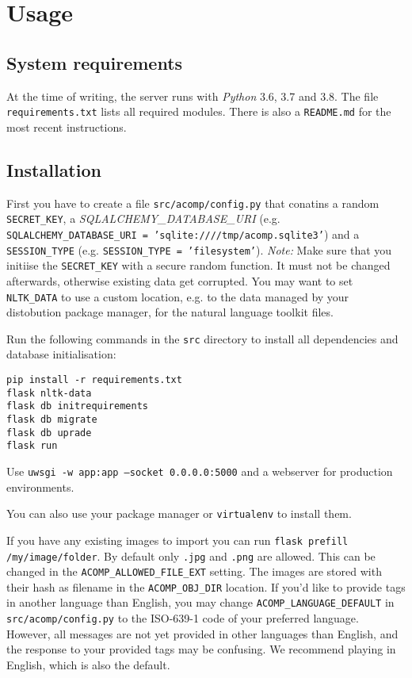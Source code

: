 \section{Usage}
\label{g14:sec:usage}

\subsection{System requirements}
\label{g14:sec:usage:requirements}
At the time of writing, the server runs with \textit{Python} 3.6, 3.7 and 3.8. The file
\texttt{requirements.txt} lists all required modules.
There is also a \texttt{README.md} for the most recent instructions.

\subsection{Installation}
\label{g14:sec:usage:instllation}
First you have to create a file \texttt{src/acomp/config.py} that conatins
a random \texttt{SECRET\_KEY}, a \textit{SQLALCHEMY\_DATABASE\_URI}
(e.g. \texttt{SQLALCHEMY\_DATABASE\_URI = 'sqlite:////tmp/acomp.sqlite3'}) and
a \texttt{SESSION\_TYPE} (e.g. \texttt{SESSION\_TYPE = 'filesystem'}).
\textit{Note:} Make sure that you initiise the \texttt{SECRET\_KEY} with a secure random function.
It must not be changed afterwards, otherwise existing data get corrupted.
You may want to set \texttt{NLTK\_DATA} to use a custom location, e.g. to the data
managed by your distobution package manager, for the natural language toolkit files.

Run the following commands in the \texttt{src} directory to install all dependencies and
database initialisation:

\begin{verbatim}
pip install -r requirements.txt
flask nltk-data
flask db initrequirements
flask db migrate
flask db uprade
flask run
\end{verbatim}

Use \texttt{uwsgi -w app:app --socket 0.0.0.0:5000} and a webserver for production environments.

You can also use your package manager or \texttt{virtualenv} to install them.

If you have any existing images to import you can run
\texttt{flask prefill /my/image/folder}. By default only \texttt{.jpg} and \texttt{.png}
are allowed. This can be changed in the \texttt{ACOMP\_ALLOWED\_FILE\_EXT} setting. The
images are stored with their hash as filename in the \texttt{ACOMP\_OBJ\_DIR} location.
If you'd like to provide tags in another language than English, you may change
\texttt{ACOMP\_LANGUAGE\_DEFAULT} in \texttt{src/acomp/config.py} to the
ISO-639-1  code of your preferred language.
However, all messages are not yet provided in other languages than English,
and the response to your provided tags may be confusing.
We recommend playing in English, which is also the default.

